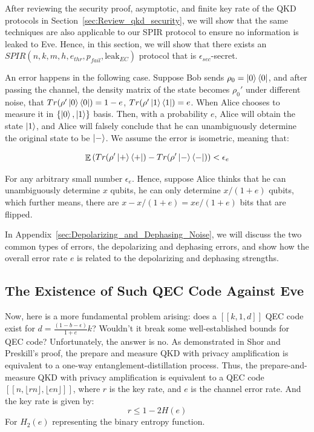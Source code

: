 \documentclass[%
 reprint,
superscriptaddress,
 amsmath,amssymb,
 aps,
]{revtex4-2}
\DeclareMathOperator{\EX}{\mathbb{E}}%
\begin{document}
After reviewing the security proof, asymptotic, and finite key rate of the QKD protocols in Section~\ref{sec:Review_qkd_security}, we will show that the same techniques are also applicable to our SPIR protocol to ensure no information is leaked to Eve. Hence, in this section, we will show that there exists an $SPIR(n, k, m, h, e_{thr}, p_{fail}, \text{leak}_{EC})$ protocol that is $\epsilon_{sec}$-secret.

An error happens in the following case. Suppose Bob sends $\rho_0=\ket{0}\bra{0}$, and after passing the channel, the density matrix of the state becomes $\rho_0'$ under different noise, that $Tr(\rho'\ket{0}\bra{0})=1-e$, $Tr(\rho'\ket{1}\bra{1})=e$. When Alice chooses to measure it in $\{\ket{0},\ket{1}\}$ basis. Then, with a probability $e$, Alice will obtain the state $\ket{1}$, and Alice will falsely conclude that he can unambiguously determine the original state to be $\ket{-}$. We assume the error is isometric, meaning that:

\begin{equation}
    \EX{\left(Tr(\rho'\ket{+}\bra{+})-Tr(\rho'\ket{-}\bra{-})\right)<\epsilon_{e}}
\end{equation}

For any arbitrary small number $\epsilon_e$. Hence, suppose Alice thinks that he can unambiguously determine $x$ qubits, he can only determine $x/(1+e)$ qubits, which further means, there are $x-x/(1+e)=xe/(1+e)$ bits that are flipped. 

In Appendix~\ref{sec:Depolarizing_and_Dephasing_Noise}, we will discuss the two common types of errors, the depolarizing and dephasing errors, and show how the overall error rate $e$ is related to the depolarizing and dephasing strengths.

\subsection{The Existence of Such QEC Code Against Eve}
\label{sec:QECC_existence}
Now, here is a more fundamental problem arising: does a $[[k, 1, d]]$ QEC code exist for $d=\frac{(1-b-\epsilon)}{1+e}k$? Wouldn't it break some well-established bounds for QEC code? Unfortunately, the answer is no. As demonstrated in Shor and Preskill's proof, the prepare and measure QKD with privacy amplification is equivalent to a one-way entanglement-distillation process. Thus, the prepare-and-measure QKD with privacy amplification is equivalent to a QEC code $[[n, \lfloor rn\rfloor, \lfloor en\rfloor]]$, where $r$ is the key rate, and $e$ is the channel error rate. And the key rate is given by:
\begin{equation}
    r\le 1-2H(e)
\end{equation}
For $H_2(e)$ representing the binary entropy function.
\end{document}
